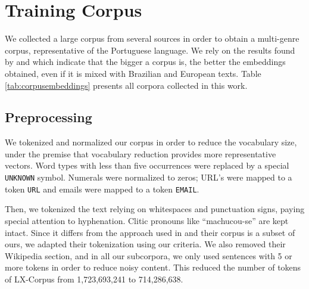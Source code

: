 \section{Training Corpus}

We collected a large corpus from several sources in order to obtain a multi-genre corpus, representative of the Portuguese language. We rely on the results found by \cite{rodriguesetal2016} and \cite{Fonseca2016} which indicate that the bigger a corpus is, the better the embeddings obtained, even if it is mixed with Brazilian and European texts. Table \ref{tab:corpusembeddings} presents all corpora collected in this work.

\subsection{Preprocessing}

We tokenized and normalized our corpus in order to reduce the vocabulary size, under the premise that vocabulary reduction provides more representative vectors. Word types with less than five occurrences were replaced by a special \texttt{UNKNOWN} symbol. %
Numerals were normalized to zeros;  URL's were mapped to a token \texttt{URL} and emails were mapped to a token \texttt{EMAIL}. 

Then, we tokenized the text relying on whitespaces and punctuation signs, paying special attention to hyphenation. Clitic pronouns like ``machucou-se'' are kept intact. Since it differs from the approach used in \cite{rodriguesetal2016} and their corpus is a subset of ours, we adapted their tokenization using our criteria. We also removed their Wikipedia section, and in all our subcorpora, we only used sentences with 5 or more tokens in order to reduce noisy content. This reduced the number of tokens of LX-Corpus from 1,723,693,241 to 714,286,638. 




